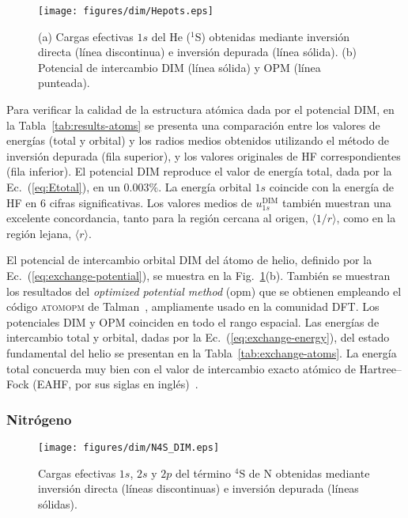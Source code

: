 \begin{figure}[t]
\centering
\texttt{[image: figures/dim/Hepots.eps]}
\caption[Cargas efectivas y potencial de intercambio DIM de He.]
{(a) Cargas efectivas $1s$ del He ($^1$S) obtenidas mediante inversión 
directa (línea discontinua) e inversión depurada (línea sólida). 
(b) Potencial de intercambio DIM (línea sólida) y OPM (línea punteada).}
\label{fig:Hepots}
\end{figure}

Para verificar la calidad de la estructura atómica dada por el potencial 
DIM, en la Tabla~\ref{tab:results-atoms} se presenta una comparación 
entre los valores de energías (total y orbital) y los radios medios 
obtenidos utilizando el método de inversión depurada (fila superior), y  
los valores originales de HF correspondientes (fila inferior). El 
potencial DIM reproduce el valor de energía total, dada por la 
Ec.~(\ref{eq:Etotal}), en un $0.003\%$. La energía orbital $1s$ coincide 
con la energía de HF en 6 cifras significativas. Los valores medios de 
$u_{1s}^{\mathrm{DIM}}$ también muestran una excelente concordancia, 
tanto para la región cercana al origen, $\langle 1/r\rangle$, como en la 
región lejana, $\langle r\rangle$.

El potencial de intercambio orbital DIM del átomo de helio, definido por 
la Ec.~(\ref{eq:exchange-potential}), se muestra en la 
Fig.~\ref{fig:Hepots}(b). También se muestran los resultados del 
\textit{optimized potential method} (\acs{opm}) que se obtienen 
empleando el código \textsc{atomopm} de Talman~\cite{Talman:76,
Talman:89}, ampliamente usado en la comunidad DFT. Los potenciales DIM y 
OPM coinciden en todo el rango espacial. Las energías de intercambio 
total y orbital, dadas por la Ec.~(\ref{eq:exchange-energy}), del estado 
fundamental del helio se presentan en la Tabla~\ref{tab:exchange-atoms}. 
La energía total concuerda muy bien con el valor de intercambio exacto 
atómico de Hartree--Fock (EAHF, por sus siglas en 
inglés)~\cite{Becke:88}.

\subsubsection{Nitrógeno}

\begin{figure}[t]
\centering
\texttt{[image: figures/dim/N4S\_DIM.eps]}
\caption[Cargas efectivas DIM de N.]
{Cargas efectivas $1s$, $2s$ y $2p$ del término $^4$S de N obtenidas 
mediante inversión directa (líneas discontinuas) e inversión depurada 
(líneas sólidas).}
\label{fig:Nzeff}
\end{figure}

